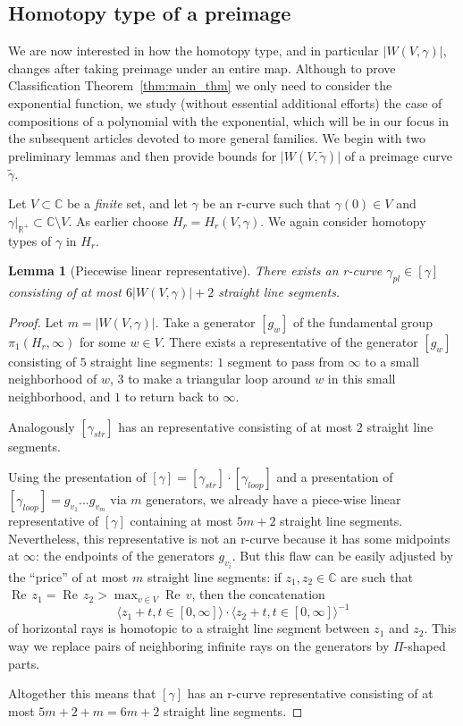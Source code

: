 \documentclass[10pt,reqno,a4paper]{amsart}
\numberwithin{figure}{section}
\numberwithin{equation}{section}
\newtheorem{lmm}[thm]{Lemma}
\renewcommand{\Re}{\operatorname{Re\,}}
\newcommand{\abs}[1]{\lvert #1 \rvert}
\begin{document}
\subsection{Homotopy type of a preimage}

We are now interested in how the homotopy type, and in particular $\abs{W(V,\gamma)}$, changes after taking preimage under an entire map. Although to prove Classification Theorem~\ref{thm:main_thm} we only need to consider the exponential function, we study (without essential additional efforts) the case of compositions of a polynomial with the exponential, which will be in our focus in the subsequent articles devoted to more general families. We begin with two preliminary lemmas and then provide bounds for $\abs{W(V,\tilde{\gamma})}$ of a preimage curve $\tilde{\gamma}$.

Let $V\subset \mathbb{C}$ be a \emph{finite} set, and let $\gamma$ be an r-curve such that $\gamma(0)\in V$ and $\gamma|_{\mathbb{R}^+}\subset\mathbb{C}\setminus V$. As earlier choose $H_r=H_r(V,\gamma)$. We again consider homotopy types of $\gamma$ in $H_r$.

\begin{lmm}[Piecewise linear representative]
	\label{lmm:piecewise_linear_representative}
	There exists an r-curve $\gamma_{pl}\in [\gamma]$ consisting of at most $6\abs{W(V,\gamma)}+2$ straight line segments.	
\end{lmm}
\begin{proof}
	Let $m=\abs{W(V,\gamma)}$. Take a generator $[g_w]$ of the fundamental group ${\pi_1(H_r,\infty)}$ for some $w\in V$. There exists a representative of the generator $[g_w]$ consisting of $5$ straight line segments: $1$ segment to pass from $\infty$ to a small neighborhood of $w$, $3$ to make a triangular loop around $w$ in this small neighborhood, and $1$ to return back to $\infty$.
	
	Analogously $[\gamma_{str}]$ has an representative consisting of at most $2$ straight line segments.
	
	Using the presentation of $[\gamma]=[\gamma_{str}]\cdot[\gamma_{loop}]$  and a presentation of $[\gamma_{loop}]=g_{v_1}...g_{v_m}$ via $m$ generators, we already have a piece-wise linear representative of $[\gamma]$  containing at most $5m+2$ straight line segments. Nevertheless, this representative is not an r-curve because it has some midpoints at $\infty$: the endpoints of the generators $g_{v_i}$. But this flaw can be easily adjusted by the ``price'' of at most $m$ straight line segments: if $z_1,z_2\in\mathbb{C}$ are such that $\Re z_1=\Re z_2>\max_{v\in V} \Re v$, then the concatenation
	$$\langle z_1+t,t\in[0,\infty]\rangle\cdot \langle z_2+t,t\in[0,\infty]\rangle^{-1}$$
	of horizontal rays is homotopic to a straight line segment between $z_1$ and $z_2$. This way we replace pairs of neighboring infinite rays on the generators by $\Pi$-shaped parts.
	
	Altogether this means that $[\gamma]$ has an r-curve representative consisting of at most $5m+2+m=6m+2$ straight line segments.	
\end{proof}
\end{document}
